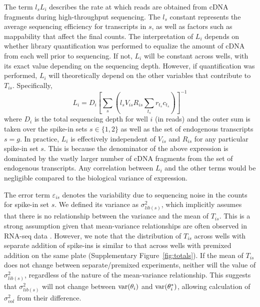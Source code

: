 \documentclass{article}
\begin{document}
The term $l_s L_i$ describes the rate at which reads are obtained from cDNA fragments during high-throughput sequencing.
The $l_s$ constant represents the average sequencing efficiency for transcripts in $s$, as well as factors such as mappability that affect the final counts.
The interpretation of $L_i$ depends on whether library quantification was performed to equalize the amount of cDNA from each well prior to sequencing.
If not, $L_i$ will be constant across wells, with its exact value depending on the sequencing depth.
However, if quantification was performed, $L_i$ will theoretically depend on the other variables that contribute to $T_{is}$.
Specifically,
\[
    L_i = D_i \left[ \sum_{s} \left( l_s V_{is} R_{is} \sum_{t_s} r_{t_s} c_{t_s} \right) \right]^{-1}
\]
where $D_i$ is the total sequencing depth for well $i$ (in reads) and the outer sum is taken over the spike-in sets $s\in \{1, 2\}$ as well as the set of endogenous transcripts $s=g$.
In practice, $L_i$ is effectively independent of $V_{is}$ and $R_{is}$ for any particular spike-in set $s$.
This is because the denominator of the above expression is dominated by the vastly larger number of cDNA fragments from the set of endogenous transcripts.
Any correlation between $L_i$ and the other terms would be negligible compared to the biological variance of expression.

The error term $\varepsilon_{is}$ denotes the variability due to sequencing noise in the counts for spike-in set $s$.
We defined its variance as $\sigma^2_{lib(s)}$, which implicitly assumes that there is no relationship between the variance and the mean of $T_{is}$.
This is a strong assumption given that mean-variance relationships are often observed in RNA-seq data \citep{mccarthy2012differential,law2014voom}.
However, we note that the distribution of $T_{is}$ across wells with separate addition of spike-ins is similar to that across wells with premixed addition on the same plate (Supplementary Figure~\ref{fig:totals}).
If the mean of $T_{is}$ does not change between separate/premixed experiments, neither will the value of $\sigma^2_{lib(s)}$, regardless of the nature of the mean-variance relationship. 
This suggests that $\sigma^2_{lib(s)}$ will not change between $\mbox{var}(\theta_i)$ and $\mbox{var}(\theta^*_i)$, allowing calculation of $\sigma^2_{vol}$ from their difference.
\end{document}
